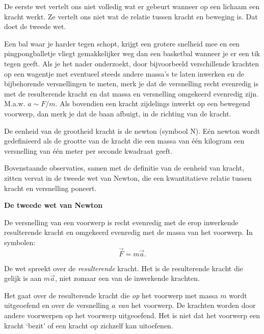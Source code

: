 \documentclass{ximera}
\begin{document}
	\author{Bart Lambregs}

De eerste wet vertelt ons niet volledig wat er gebeurt wanneer op een lichaam een kracht werkt. Ze vertelt ons niet wat de relatie tussen kracht en beweging is. Dat doet de tweede wet.

Een bal waar je harder tegen schopt, krijgt een grotere snelheid mee en een pingpongballetje vliegt gemakkelijker weg dan een basketbal wanneer je er een tik tegen geeft. Als je het nader onderzoekt, door bijvoorbeeld verschillende krachten op een wagentje met eventueel steeds andere massa's te laten inwerken en de bijbehorende versnellingen te meten, merk je dat de versnelling recht evenredig is met de resulterende kracht en dat massa en versnelling omgekeerd evenredig zijn. M.a.w. $a\sim F/m$. Als bovendien een kracht zijdelings inwerkt op een bewegend voorwerp, dan merk je dat de baan afbuigt, in de richting van de kracht.

De eenheid van de grootheid kracht is de newton (symbool N). E\'en newton wordt gedefinieerd als de grootte van de kracht die een massa van \'e\'en kilogram een versnelling van \'e\'en meter per seconde kwadraat geeft.

Bovenstaande observaties, samen met de definitie van de eenheid van kracht, zitten vervat in de tweede wet van Newton, die een kwantitatieve relatie tussen kracht en versnelling poneert.

\begin{definition}
{\textbf{De tweede wet van Newton}} \nl

De versnelling van een voorwerp is recht evenredig met de erop inwerkende resulterende kracht en omgekeerd evenredig met de massa van het voorwerp. In symbolen:
\begin{equation*}
\vec{F}=m\vec{a}.
\end{equation*}
\end{definition}

\begin{remark}{De wet spreekt over de \emph{resulterende} kracht.} Het is de resulterende kracht die gelijk is aan $m\vec{a}$, niet zomaar een van de inwerkende krachten.
\end{remark}

\begin{remark}{Het gaat over de resulterende kracht die \emph{op} het voorwerp met massa $m$ wordt uitgeoefend en over de versnelling $a$ \emph{van} het voorwerp.} De krachten worden door andere voorwerpen op het voorwerp uitgeoefend. Het is niet dat het voorwerp een kracht `bezit' of een kracht op zichzelf kan uitoefenen.
	
\end{remark}
\end{document}
